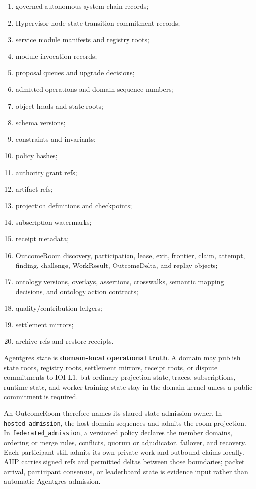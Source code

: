\documentclass[
  11pt,
]{article}
\providecommand{\tightlist}{%
  \setlength{\itemsep}{0pt}\setlength{\parskip}{0pt}}
\begin{document}
\begin{enumerate}
\def\labelenumi{\arabic{enumi}.}
\tightlist
\item
  governed autonomous-system chain records;
\item
  Hypervisor-node state-transition commitment records;
\item
  service module manifests and registry roots;
\item
  module invocation records;
\item
  proposal queues and upgrade decisions;
\item
  admitted operations and domain sequence numbers;
\item
  object heads and state roots;
\item
  schema versions;
\item
  constraints and invariants;
\item
  policy hashes;
\item
  authority grant refs;
\item
  artifact refs;
\item
  projection definitions and checkpoints;
\item
  subscription watermarks;
\item
  receipt metadata;
\item
  OutcomeRoom discovery, participation, lease, exit, frontier, claim,
  attempt, finding, challenge, WorkResult, OutcomeDelta, and replay objects;
\item
  ontology versions, overlays, assertions, crosswalks, semantic mapping
  decisions, and ontology action contracts;
\item
  quality/contribution ledgers;
\item
  settlement mirrors;
\item
  archive refs and restore receipts.
\end{enumerate}

Agentgres state is \textbf{domain-local operational truth}. A domain may
publish state roots, registry roots, settlement mirrors, receipt roots,
or dispute commitments to IOI L1, but ordinary projection state, traces,
subscriptions, runtime state, and worker-training state stay in the
domain kernel unless a public commitment is required.

An OutcomeRoom therefore names its shared-state admission owner. In
\texttt{hosted\_admission}, the host domain sequences and admits the room
projection. In \texttt{federated\_admission}, a versioned policy declares the
member domains, ordering or merge rules, conflicts, quorum or adjudicator,
failover, and recovery. Each participant still admits its own private work and
outbound claims locally. AIIP carries signed refs and permitted deltas between
those boundaries; packet arrival, participant consensus, or leaderboard state
is evidence input rather than automatic Agentgres admission.
\end{document}
